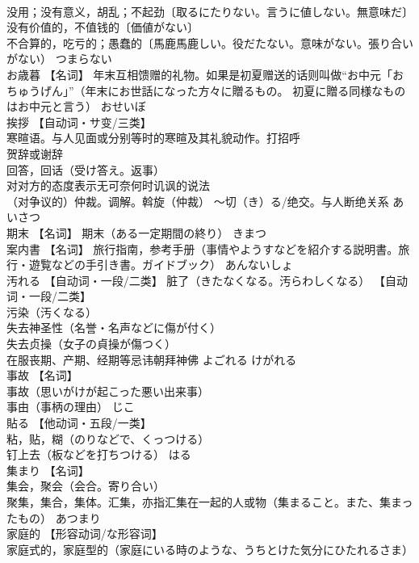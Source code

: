\documentclass[8pt]{extreport}
\begin{document}
\begin{CJK}{UTF8}{min}
\\	没用；没有意义，胡乱；不起劲〔取るにたりない。言うに値しない。無意味だ〕 
\\	没有价值的，不值钱的〔価値がない〕 
\\	不合算的，吃亏的；愚蠢的〔馬鹿馬鹿しい。役だたない。意味がない。張り合いがない）	つまらない	
\\	お歳暮	【名词】 年末互相馈赠的礼物。如果是初夏赠送的话则叫做“お中元「おちゅうげん」”（年末にお世話になった方々に贈るもの。 初夏に贈る同様なものはお中元と言う）	おせいぼ	
\\	挨拶	【自动词・サ变/三类】 
\\	寒暄语。与人见面或分别等时的寒暄及其礼貌动作。打招呼 
\\	贺辞或谢辞 
\\	回答，回话（受け答え。返事） 
\\	对对方的态度表示无可奈何时讥讽的说法 
\\	（对争议的）仲裁。调解。斡旋（仲裁） ～切（き）る/绝交。与人断绝关系	あいさつ	
\\	期末	【名词】 期末（ある一定期間の終り）	きまつ	
\\	案内書	【名词】 旅行指南，参考手册（事情やようすなどを紹介する説明書。旅行・遊覧などの手引き書。ガイドブック）	あんないしょ	
\\	汚れる	【自动词・一段/二类】 脏了（きたなくなる。汚らわしくなる） 【自动词・一段/二类】 
\\	污染（汚くなる） 
\\	失去神圣性（名誉・名声などに傷が付く） 
\\	失去贞操（女子の貞操が傷つく） 
\\	在服丧期、产期、经期等忌讳朝拜神佛	よごれる けがれる	
\\	事故	【名词】 
\\	事故（思いがけが起こった悪い出来事） 
\\	事由（事柄の理由）	じこ	
\\	貼る	【他动词・五段/一类】 
\\	粘，贴，糊（のりなどで、くっつける） 
\\	钉上去（板などを打ちつける）	はる	
\\	集まり	【名词】 
\\	集会，聚会（会合。寄り合い） 
\\	聚集，集合，集体。汇集，亦指汇集在一起的人或物（集まること。また、集まったもの）	あつまり	
\\	家庭的	【形容动词/な形容词】 
\\	家庭式的，家庭型的（家庭にいる時のような、うちとけた気分にひたれるさま） 

\end{CJK}
\end{document}
